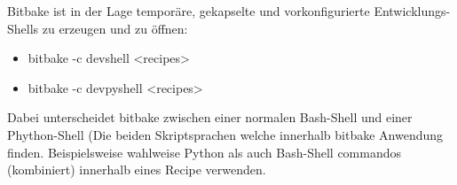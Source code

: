Bitbake ist in der Lage temporäre, gekapselte und vorkonfigurierte
Entwicklungs-Shells zu erzeugen und zu öffnen:

\begin{itemize}
    \item bitbake -c devshell <recipes>
    \item bitbake -c devpyshell <recipes>
\end{itemize}

Dabei unterscheidet bitbake zwischen einer normalen Bash-Shell und einer
Phython-Shell (Die beiden Skriptsprachen welche innerhalb bitbake Anwendung
finden. Beispielsweise wahlweise Python als auch Bash-Shell commandos
(kombiniert) innerhalb eines Recipe verwenden.



